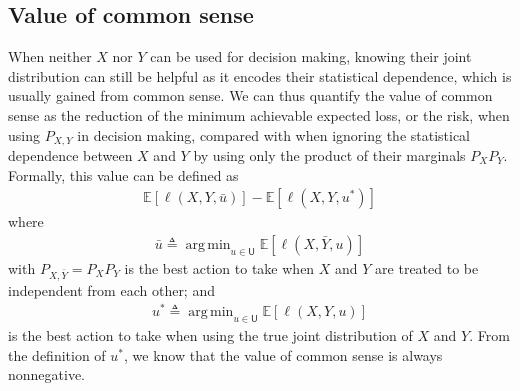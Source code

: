 \documentclass{article}
\newcommand{\E}{\mathbb{E}}
\DeclareMathOperator*{\argmin}{arg\,min}
\def\sU{{\mathsf U}}
\def\deq{\triangleq}
\begin{document}
\subsection{Value of common sense}
When neither $X$ nor $Y$ can be used for decision making, knowing their joint distribution can still be helpful as it encodes their statistical dependence, which is usually gained from common sense.
We can thus quantify the value of common sense as the reduction of the minimum achievable expected loss, or the risk, when using $P_{X,Y}$ in decision making, compared with when ignoring the statistical dependence between $X$ and $Y$ by using only the product of their marginals $P_X P_Y$. Formally, this value can be defined as
	\begin{align}\label{eq:vocomsen_def}
		 \E[\ell(X,Y,\bar u)] - \E[\ell(X,Y,u^*)] 
	\end{align}
    where
\begin{align}\label{eq:ubar_def}
\bar u\deq\argmin_{u\in\sU} \E[\ell(X,\bar Y,u)]
\end{align}
with $P_{X,\bar Y} = P_X P_Y$ is the best action to take when $X$ and $Y$ are treated to be independent from each other; and
\begin{align}\label{eq:u*_def}
    u^*\deq\argmin_{u\in\sU} \E[\ell(X,Y,u)]
\end{align}
is the best action to take when using the true joint distribution of $X$ and $Y$.
From the definition of $u^*$, we know that the value of common sense is always nonnegative. 
\end{document}
